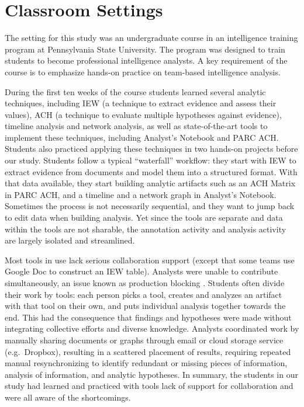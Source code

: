 \section{Classroom Settings}\label{classroom-study-settings}

The setting for this study was an undergraduate course in an intelligence
training program at Pennsylvania State University. The program was designed to train students
to become professional intelligence analysts. A key requirement of the course is
to emphasize hands-on practice on team-based intelligence analysis.


 During the first ten weeks of the course
 students learned several analytic techniques, including IEW (a technique
 to extract evidence and assess their values), ACH (a technique to evaluate
 multiple hypotheses against evidence), timeline analysis and network
 analysis, as well as state-of-the-art tools to implement these
 techniques, including Analyst's Notebook and PARC ACH. Students also practiced applying these
 techniques in two hands-on projects before our study. Students follow a typical ``waterfall'' workflow: they start with IEW to
 extract evidence from documents and model them into a structured format. With that data available, they start building analytic
 artifacts such as an ACH Matrix in PARC ACH, and a timeline and a network
 graph in Analyst's Notebook. Sometimes the process is not necessarily sequential, and they want to jump back to edit data when building analysis. Yet since the tools are separate and data within the tools are not sharable, the annotation activity and analysis activity are largely isolated and streamlined. 
 
 Most tools in use lack serious collaboration
 support (except that some teams use Google Doc to construct an IEW
 table). Analysts were unable to contribute simultaneously, an issue
 known as production blocking \citep{Diehl1987a}. Students often divide their work by tools: each person picks a tool, creates and analyzes an artifact
 with that tool on their own, and puts individual analysis together towards the end. This had the consequence that findings and
 hypotheses were made without integrating collective efforts and diverse
 knowledge. Analysts coordinated work by manually sharing documents
 or graphs through email or cloud storage service (e.g.~Dropbox),
 resulting in a scattered placement of results, requiring repeated manual
 resynchronizing to identify redundant or missing pieces of information,
 analysis of information, and analytic hypotheses. In summary, the students in our study had learned and practiced with tools lack of support for collaboration and were all aware of the shortcomings.


